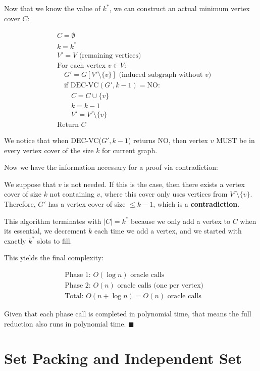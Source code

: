 \documentclass[12pt]{article}
\begin{document}
Now that we know the value of $k^*$, we can construct an actual minimum vertex cover $C$:

\begin{align}
&C = \emptyset\\
&k = k^*\\
&V' = V \text{ (remaining vertices)}\\
&\text{For each vertex } v \in V:\\
&\quad G' = G[V' \setminus \{v\}] \text{ (induced subgraph without } v)\\
&\quad \text{if DEC-VC}(G', k-1) = \text{NO}:\\
&\quad\quad C = C \cup \{v\}\\
&\quad\quad k = k - 1\\
&\quad\quad V' = V' \setminus \{v\}\\
&\text{Return } C
\end{align}

We notice that when DEC-VC($G',k-1$) returns NO, then vertex $v$ MUST be in every vertex cover of the size $k$ for current graph.

Now we have the information necessary for a proof via contradiction:

We suppose that $v$ is not needed. If this is the case, then there exists a vertex cover of size $k$ not containing $v$, where this cover only uses vertices from $V' \setminus \{ v \}$. Therefore, $G'$ has a vertex cover of size $\leq k-1$, which is a \textbf{contradiction}.

This algorithm terminates with $|C|=k^*$ because we only add a vertex to $C$ when its essential, we decrement $k$ each time we add a vertex, and we started with exactly $k^*$ slots to fill.

This yields the final complexity:

\begin{align}
&\text{Phase 1: } O(\log n) \text{ oracle calls}\\
&\text{Phase 2: } O(n) \text{ oracle calls (one per vertex)}\\
&\text{Total: } O(n + \log n) = O(n) \text{ oracle calls}
\end{align}

Given that each phase call is completed in polynomial time, that means the full reduction also runs in polynomial time. $\blacksquare$

\section{Set Packing and Independent Set}
\end{document}
